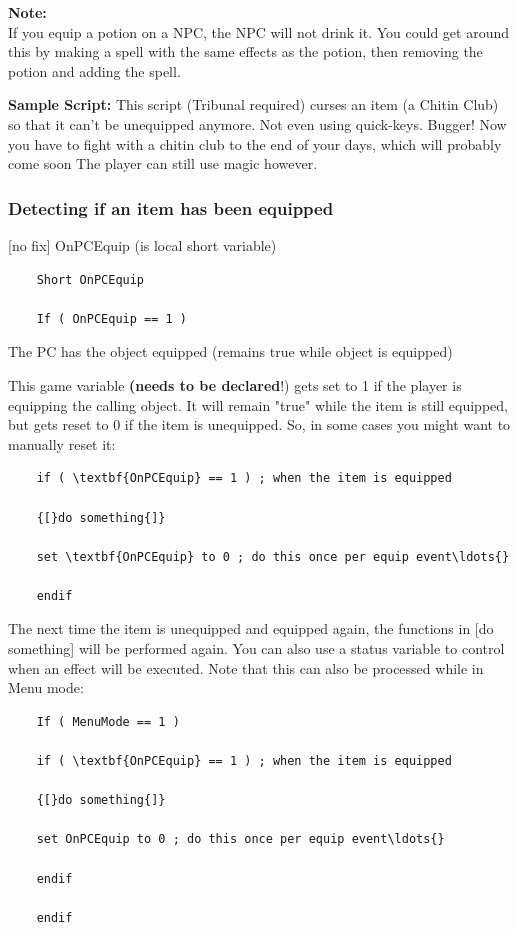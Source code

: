 \textbf{Note:\\
}If you equip a potion on a NPC, the NPC will not drink it. You could
get around this by making a spell with the same effects as the potion,
then removing the potion and adding the spell.\textbf{\hfill\break
}

\textbf{Sample Script:} This script (Tribunal required) curses an item
(a Chitin Club) so that it can't be unequipped anymore. Not even using
quick-keys. Bugger! Now you have to fight with a chitin club to the end
of your days, which will probably come soon The player can still use
magic however.



\hypertarget{detecting-if-an-item-has-been-equipped}{%
\subsubsection{Detecting if an item has been
equipped}\label{detecting-if-an-item-has-been-equipped}}

{[}no fix{]} OnPCEquip (is local short variable)

\begin{lstlisting}
	Short OnPCEquip
	
	If ( OnPCEquip == 1 )
\end{lstlisting}

The PC has the object equipped (remains true while object is equipped)

This game variable \textbf{(needs to be declared}!) gets set to 1 if the
player is equipping the calling object. It will remain "true" while the
item is still equipped, but gets reset to 0 if the item is unequipped.
So, in some cases you might want to manually reset it:

\begin{lstlisting}
	if ( \textbf{OnPCEquip} == 1 ) ; when the item is equipped
	
	{[}do something{]}
	
	set \textbf{OnPCEquip} to 0 ; do this once per equip event\ldots{}
	
	endif
\end{lstlisting}

The next time the item is unequipped and equipped again, the functions
in {[}do something{]} will be performed again. You can also use a status
variable to control when an effect will be executed. Note that this can
also be processed while in Menu mode:

\begin{lstlisting}
	If ( MenuMode == 1 )
	
	if ( \textbf{OnPCEquip} == 1 ) ; when the item is equipped
	
	{[}do something{]}
	
	set OnPCEquip to 0 ; do this once per equip event\ldots{}
	
	endif
	
	endif
\end{lstlisting}

